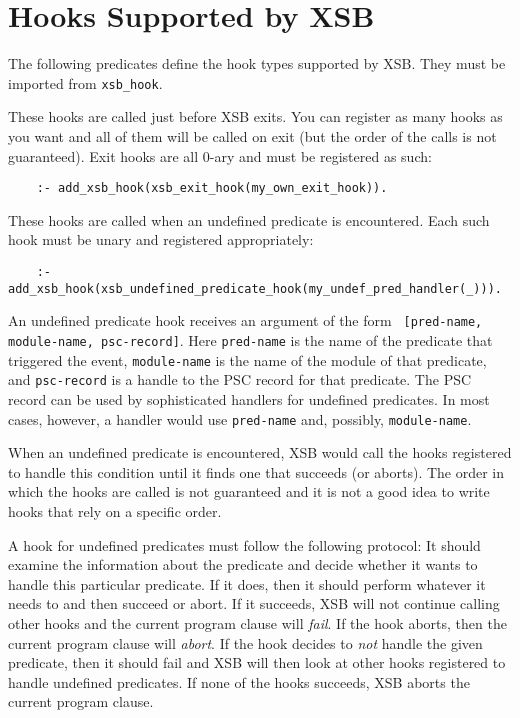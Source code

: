 \section{Hooks Supported by XSB}

The following predicates define the hook types supported by XSB. They must
be imported from {\tt xsb\_hook}.

\begin{description}
 

These hooks are called just before XSB exits. You can register as many
hooks as you want and all of them will be called on exit (but the order of
the calls is not guaranteed). Exit hooks are all 0-ary and must be registered
as such:
\begin{verbatim}
    :- add_xsb_hook(xsb_exit_hook(my_own_exit_hook)).
\end{verbatim}


These hooks are called when an undefined predicate is encountered.
Each such hook must be unary and registered appropriately:
\begin{verbatim}
    :- add_xsb_hook(xsb_undefined_predicate_hook(my_undef_pred_handler(_))).
\end{verbatim}
An undefined predicate hook receives an argument of the form {\tt
  [pred-name, module-name, psc-record]}. Here {\tt pred-name} is the name
of the predicate that triggered the event, {\tt module-name} is the name of
the module of that predicate, and {\tt psc-record} is a handle to the PSC
record for that predicate. The PSC record can be used by sophisticated
handlers for undefined predicates. In most cases, however, a handler would
use {\tt pred-name} and, possibly, {\tt module-name}.

When an undefined predicate is encountered, XSB would call the hooks
registered to handle this condition until it finds one that succeeds (or
aborts). The order in which the hooks are called is not guaranteed and it
is not a good idea to write hooks that rely on a specific order.

A hook for undefined predicates must follow the following protocol: It
should examine the information about the predicate and decide whether it
wants to handle this particular predicate. If it does, then it should
perform whatever it needs to and then succeed or abort. If it succeeds, XSB
will not continue calling other hooks and the current program clause will
{\em fail}. If the hook aborts, then the current program clause will
\emph{abort}.  If the hook decides to \emph{not} handle the given
predicate, then it should fail and XSB will then look at other hooks
registered to handle undefined predicates. If none of the hooks succeeds,
XSB aborts the current program clause.


\end{description}
